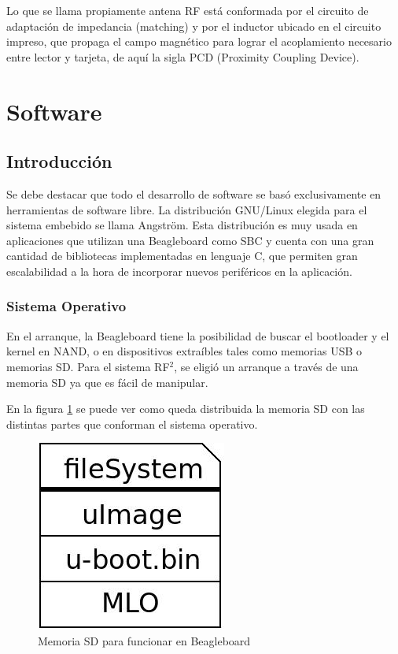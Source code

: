 \documentclass[%
        final,
        notitlepage,
        narroweqnarray,
        inline,
        ]{ieee}
\begin{document}
Lo que se llama propiamente antena RF está conformada por el circuito de adaptación de impedancia (matching) y por el inductor ubicado en el circuito impreso, que propaga el campo magnético para lograr el acoplamiento necesario entre lector y tarjeta, de aquí la sigla PCD (Proximity Coupling Device).



\section{Software}

\subsection{Introducción}
Se debe destacar que todo el desarrollo de software se basó exclusivamente en herramientas de software libre. La distribución GNU/Linux elegida para el sistema embebido se llama Angström. Esta distribución es muy usada en aplicaciones que utilizan una Beagleboard como SBC y cuenta con una gran cantidad de bibliotecas implementadas en lenguaje C, que permiten gran escalabilidad a la hora de incorporar nuevos periféricos en la aplicación.


\subsubsection{Sistema Operativo}
En el arranque, la Beagleboard tiene la posibilidad de buscar el bootloader y el kernel en NAND, o en dispositivos extraíbles tales como memorias USB o memorias SD. Para el sistema RF$^{2}$, se eligió un arranque a través de una memoria SD ya que es fácil de manipular.

En la figura \ref{Fig:SD} se puede ver como queda distribuida la memoria SD con las distintas partes
que conforman el sistema operativo. 

\begin{figure}[h]
\centering
  \begin{center}
  \includegraphics[scale=.4]{../docs/Imagenes/sd.jpg} 
  \end{center}
  \caption{Memoria SD para funcionar en Beagleboard}\label{Fig:SD} 
\end{figure}
\end{document}

